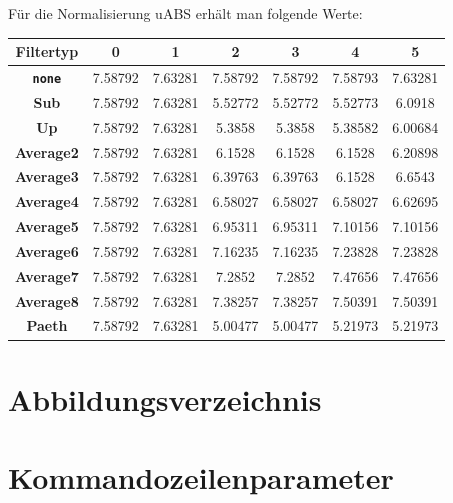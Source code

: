 \documentclass[a4paper,12pt]{article}
\begin{document}
Für die Normalisierung uABS erhält man folgende Werte:
\par
\vspace{1cm}
\begin{tabular}{c | c | c | c | c | c | c}
Filtertyp & 0 &  1 & 2 & 3 & 4 & 5
\\
\hline
\textbf{{\tt{none}}} &  7.58792 & 7.63281 & 7.58792 & 7.58792  & 7.58793 &  7.63281
\\
\textbf{Sub} & 7.58792 &   7.63281 & 5.52772 &  5.52772 &  5.52773   & 6.0918
\\
\textbf{Up} & 7.58792 &  7.63281 & 5.3858 & 5.3858  &  5.38582  &  6.00684 
\\
\textbf{Average2} & 7.58792 &  7.63281 & 6.1528 & 6.1528 & 6.1528  & 6.20898
\\
\textbf{Average3} & 7.58792 &  7.63281 & 6.39763 & 6.39763 & 6.1528 & 6.6543 
\\
\textbf{Average4} & 7.58792 &  7.63281 & 6.58027 & 6.58027 & 6.58027  & 6.62695 
\\
\textbf{Average5} & 7.58792 &  7.63281 & 6.95311 & 6.95311 & 7.10156 &  7.10156 
\\
\textbf{Average6} & 7.58792 &  7.63281 & 7.16235 & 7.16235 & 7.23828 &  7.23828 
\\
\textbf{Average7} & 7.58792 &  7.63281 & 7.2852 &  7.2852 & 7.47656   &  7.47656
\\
\textbf{Average8} & 7.58792 &  7.63281 & 7.38257 &  7.38257  & 7.50391  & 7.50391
\\
\textbf{Paeth} & 7.58792 &  7.63281 & 5.00477 &   5.00477  & 5.21973  & 5.21973 
\end{tabular}


\newpage
\section{Abbildungsverzeichnis}
\listoffigures

\newpage
\section{Kommandozeilenparameter}\label{Kommandozeilenparameter}
\newpage
\listoffigures
\newpage
\end{document}
